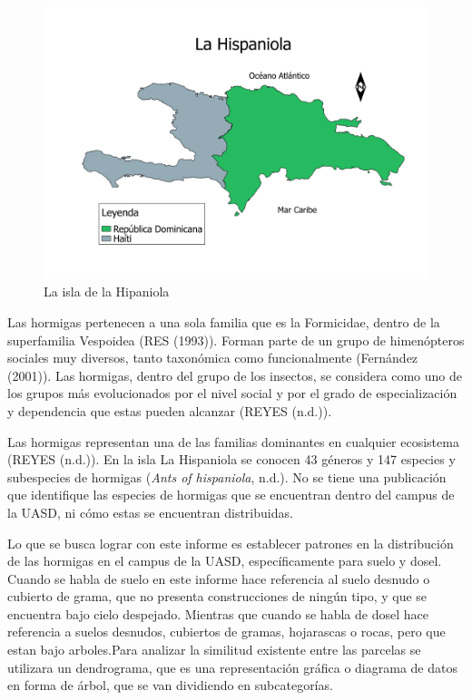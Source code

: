 \documentclass[11pt,]{article}
\begin{document}
\begin{figure}
\centering
\includegraphics{La Hispan.jpeg}
\caption{La isla de la Hipaniola}
\end{figure}

Las hormigas pertenecen a una sola familia que es la Formicidae, dentro
de la superfamilia Vespoidea (RES (1993)). Forman parte de un grupo de
himenópteros sociales muy diversos, tanto taxonómica como funcionalmente
(Fernández (2001)). Las hormigas, dentro del grupo de los insectos, se
considera como uno de los grupos más evolucionados por el nivel social y
por el grado de especialización y dependencia que estas pueden alcanzar
(REYES (n.d.)).

Las hormigas representan una de las familias dominantes en cualquier
ecosistema (REYES (n.d.)). En la isla La Hispaniola se conocen 43
géneros y 147 especies y subespecies de hormigas (\emph{Ants of
hispaniola}, n.d.). No se tiene una publicación que identifique las
especies de hormigas que se encuentran dentro del campus de la UASD, ni
cómo estas se encuentran distribuidas.

Lo que se busca lograr con este informe es establecer patrones en la
distribución de las hormigas en el campus de la UASD, específicamente
para suelo y dosel. Cuando se habla de suelo en este informe hace
referencia al suelo desnudo o cubierto de grama, que no presenta
construcciones de ningún tipo, y que se encuentra bajo cielo despejado.
Mientras que cuando se habla de dosel hace referencia a suelos desnudos,
cubiertos de gramas, hojarascas o rocas, pero que estan bajo
arboles.Para analizar la similitud existente entre las parcelas se
utilizara un dendrograma, que es una representación gráfica o diagrama
de datos en forma de árbol, que se van dividiendo en subcategorías.
\end{document}
